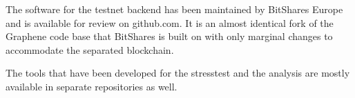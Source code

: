 The software for the testnet backend has been maintained by BitShares Europe and is
available for review on github.com. It is an almost identical fork of the
Graphene code base that BitShares is built on with only marginal changes to
accommodate the separated blockchain.

The tools that have been developed for the stresstest and the analysis are
mostly available in separate repositories as well.
